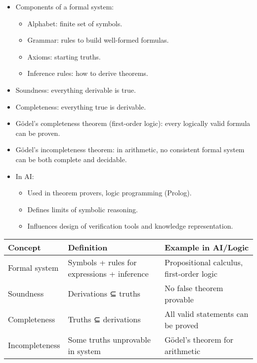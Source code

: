 \documentclass[
  letterpaper,
  DIV=11,
  numbers=noendperiod]{scrreprt}
\providecommand{\tightlist}{%
  \setlength{\itemsep}{0pt}\setlength{\parskip}{0pt}}
\begin{document}
\begin{itemize}
\item
  Components of a formal system:

  \begin{itemize}
  \tightlist
  \item
    Alphabet: finite set of symbols.
  \item
    Grammar: rules to build well-formed formulas.
  \item
    Axioms: starting truths.
  \item
    Inference rules: how to derive theorems.
  \end{itemize}
\item
  Soundness: everything derivable is true.
\item
  Completeness: everything true is derivable.
\item
  Gödel's completeness theorem (first-order logic): every logically
  valid formula can be proven.
\item
  Gödel's incompleteness theorem: in arithmetic, no consistent formal
  system can be both complete and decidable.
\item
  In AI:

  \begin{itemize}
  \tightlist
  \item
    Used in theorem provers, logic programming (Prolog).
  \item
    Defines limits of symbolic reasoning.
  \item
    Influences design of verification tools and knowledge
    representation.
  \end{itemize}
\end{itemize}

\begin{longtable}[]{@{}
  >{\raggedright\arraybackslash}p{}
  >{\raggedright\arraybackslash}p{}
  >{\raggedright\arraybackslash}p{}@{}}
\toprule\noalign{}
\begin{minipage}[b]{\linewidth}\raggedright
Concept
\end{minipage} & \begin{minipage}[b]{\linewidth}\raggedright
Definition
\end{minipage} & \begin{minipage}[b]{\linewidth}\raggedright
Example in AI/Logic
\end{minipage} \\
\midrule\noalign{}
\endhead
\bottomrule\noalign{}
\endlastfoot
Formal system & Symbols + rules for expressions + inference &
Propositional calculus, first-order logic \\
Soundness & Derivations ⊆ truths & No false theorem provable \\
Completeness & Truths ⊆ derivations & All valid statements can be
proved \\
Incompleteness & Some truths unprovable in system & Gödel's theorem for
arithmetic \\
\end{longtable}
\end{document}
